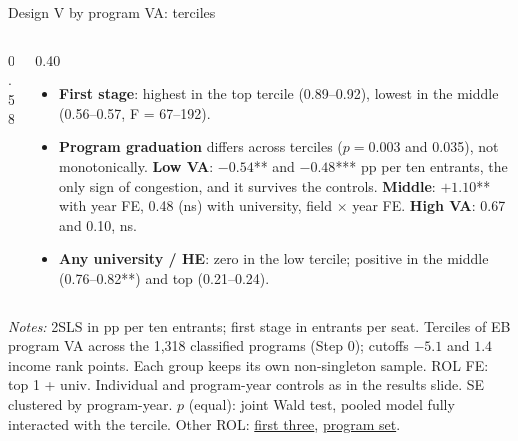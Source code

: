 \documentclass{beamer}
\begin{document}
\begin{frame}[label=d5-va-terciles]{Design V by program VA: terciles}
\begin{columns}[T,onlytextwidth]
\begin{column}{0.58\textwidth}
\centering
\tiny
\resizebox{\linewidth}{!}{}
\end{column}
\begin{column}{0.40\textwidth}
\scriptsize
\begin{itemize}
    \setlength{\itemsep}{3pt}
    \item \textbf{First stage}: highest in the top tercile (0.89--0.92), lowest in the middle (0.56--0.57, F = 67--192).
    \item \textbf{Program graduation} differs across terciles ($p=0.003$ and 0.035), not monotonically. \textbf{Low VA}: $-0.54$** and $-0.48$*** pp per ten entrants, the only sign of congestion, and it survives the controls. \textbf{Middle}: $+1.10$** with year FE, 0.48 (ns) with university, field $\times$ year FE. \textbf{High VA}: 0.67 and 0.10, ns.
    \item \textbf{Any university / HE}: zero in the low tercile; positive in the middle (0.76--0.82**) and top (0.21--0.24).
\end{itemize}
\end{column}
\end{columns}

\vspace{0.05cm}
\parbox{0.97\textwidth}{\tiny \textit{Notes:} 2SLS in pp per ten entrants; first stage in entrants per seat. Terciles of EB program VA across the 1,318 classified programs (Step 0); cutoffs $-5.1$ and $1.4$ income rank points. Each group keeps its own non-singleton sample. ROL FE: top 1 + univ. Individual and program-year controls as in the results slide. SE clustered by program-year. $p$ (equal): joint Wald test, pooled model fully interacted with the tercile. Other ROL: \hyperlink{d5-app-va-terciles-top3}{\color{blue}first three}, \hyperlink{d5-app-va-terciles-set}{\color{blue}program set}.}
\end{frame}
\end{document}
